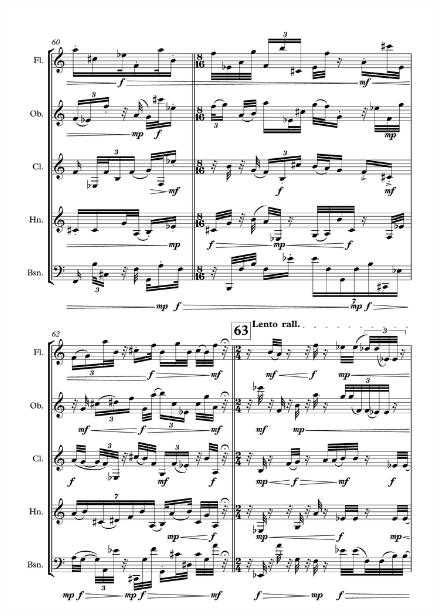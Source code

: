 \begin{figure}[H]
    \centering
	\includegraphics[width=6.5in]{figures/Out_of_Focus_13.pdf}
\end{figure}

